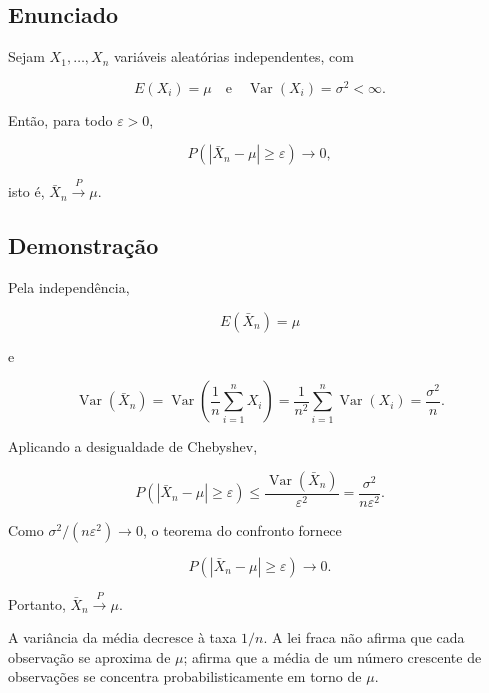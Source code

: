 \documentclass[
  letterpaper,
  DIV=11,
  numbers=noendperiod]{scrreprt}
\begin{document}

\subsection*{Enunciado}\label{enunciado}

Sejam \(X_1,\ldots,X_n\) variáveis aleatórias independentes, com

\[
E(X_i)=\mu
\quad\text{e}\quad
\operatorname{Var}(X_i)=\sigma^2<\infty.
\]

Então, para todo \(\varepsilon>0\),

\[
P\left(\left|\bar X_n-\mu\right|\geq\varepsilon\right)
\longrightarrow 0,
\]

isto é, \(\bar X_n\xrightarrow{P}\mu\).

\subsection*{Demonstração}\label{demonstrauxe7uxe3o-1}

Pela independência,

\[
E(\bar X_n)=\mu
\]

e

\[
\operatorname{Var}(\bar X_n)
=
\operatorname{Var}\left(\frac{1}{n}\sum_{i=1}^nX_i\right)
=
\frac{1}{n^2}\sum_{i=1}^n\operatorname{Var}(X_i)
=
\frac{\sigma^2}{n}.
\]

Aplicando a desigualdade de Chebyshev,

\[
P\left(\left|\bar X_n-\mu\right|\geq\varepsilon\right)
\leq
\frac{\operatorname{Var}(\bar X_n)}{\varepsilon^2}
=
\frac{\sigma^2}{n\varepsilon^2}.
\]

Como \(\sigma^2/(n\varepsilon^2)\to 0\), o teorema do confronto fornece

\[
P\left(\left|\bar X_n-\mu\right|\geq\varepsilon\right)
\to 0.
\]

Portanto, \(\bar X_n\xrightarrow{P}\mu\).

\begin{tcolorbox}[enhanced jigsaw, colback=white, leftrule=.75mm, colbacktitle=quarto-callout-tip-color!10!white, breakable, titlerule=0mm, bottomtitle=1mm, title=\textcolor{quarto-callout-tip-color}{\faLightbulb}\hspace{0.5em}{Interpretação}, colframe=quarto-callout-tip-color-frame, toprule=.15mm, opacityback=0, bottomrule=.15mm, opacitybacktitle=0.6, arc=.35mm, toptitle=1mm, rightrule=.15mm, coltitle=black, left=2mm]

A variância da média decresce à taxa \(1/n\). A lei fraca não afirma que
cada observação se aproxima de \(\mu\); afirma que a média de um número
crescente de observações se concentra probabilisticamente em torno de
\(\mu\).

\end{tcolorbox}
\end{document}
